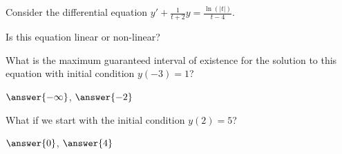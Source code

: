\documentclass{ximera}
\begin{document}
\begin{exercise}
    Consider the differential equation $y' + \frac{1}{t+2}y = \frac{\ln(|t|)}{t-4}$. 
    
    Is this equation linear or non-linear?
    \begin{multipleChoice}
    \end{multipleChoice}
    \begin{problem}
        What is the maximum guaranteed interval of existence for the solution to this equation with initial condition $y(-3) = 1$?
        
        \wordChoice{\choice[correct]{(},\choice{[}}$\answer{-\infty}$, $\answer{-2}$\wordChoice{\choice[correct]{)},\choice{]}}
        \begin{problem}        
            What if we start with the initial condition $y(2) = 5$?
            
            \wordChoice{\choice[correct]{(},\choice{[}}$\answer{0}$, $\answer{4}$\wordChoice{\choice[correct]{)},\choice{]}}
%                

        \end{problem}
    \end{problem}
\end{exercise}
\end{document}

